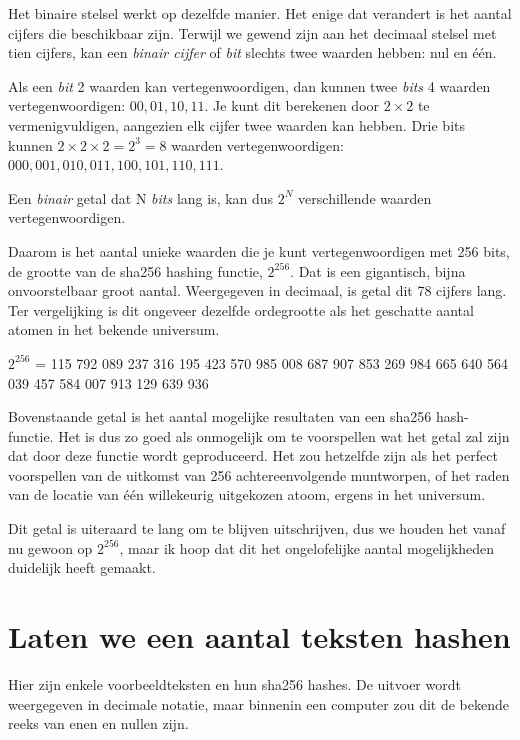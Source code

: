 \documentclass[
  letterpaper,
]{scrbook}
\begin{document}
Het binaire stelsel werkt op dezelfde manier. Het enige dat verandert is
het aantal cijfers die beschikbaar zijn. Terwijl we gewend zijn aan het
decimaal stelsel met tien cijfers, kan een \emph{binair cijfer} of
\emph{bit} slechts twee waarden hebben: nul en één.

Als een \emph{bit} 2 waarden kan vertegenwoordigen, dan kunnen twee
\emph{bits} 4 waarden vertegenwoordigen: \(00, 01, 10, 11\). Je kunt dit
berekenen door \(2 \times 2\) te vermenigvuldigen, aangezien elk cijfer
twee waarden kan hebben. Drie bits kunnen
\(2 \times 2 \times 2 = 2^3 = 8\) waarden vertegenwoordigen:
\(000, 001, 010, 011, 100, 101, 110, 111\).

Een \emph{binair} getal dat N \emph{bits} lang is, kan dus \(2^N\)
verschillende waarden vertegenwoordigen.

Daarom is het aantal unieke waarden die je kunt vertegenwoordigen met
256 bits, de grootte van de sha256 hashing functie, \(2^{256}\). Dat is
een gigantisch, bijna onvoorstelbaar groot aantal. Weergegeven in
decimaal, is getal dit 78 cijfers lang. Ter vergelijking is dit ongeveer
dezelfde ordegrootte als het geschatte aantal atomen in het bekende
universum.

\(2^{256}\) = 115 792 089 237 316 195 423 570 985 008 687 907 853 269
984 665 640 564 039 457 584 007 913 129 639 936

Bovenstaande getal is het aantal mogelijke resultaten van een sha256
hash-functie. Het is dus zo goed als onmogelijk om te voorspellen wat
het getal zal zijn dat door deze functie wordt geproduceerd. Het zou
hetzelfde zijn als het perfect voorspellen van de uitkomst van 256
achtereenvolgende muntworpen, of het raden van de locatie van één
willekeurig uitgekozen atoom, ergens in het universum.

Dit getal is uiteraard te lang om te blijven uitschrijven, dus we houden
het vanaf nu gewoon op \(2^{256}\), maar ik hoop dat dit het
ongelofelijke aantal mogelijkheden duidelijk heeft gemaakt.

\hypertarget{laten-we-een-aantal-teksten-hashen}{%
\section{Laten we een aantal teksten
hashen}\label{laten-we-een-aantal-teksten-hashen}}

Hier zijn enkele voorbeeldteksten en hun sha256 hashes. De uitvoer wordt
weergegeven in decimale notatie, maar binnenin een computer zou dit de
bekende reeks van enen en nullen zijn.
\end{document}
